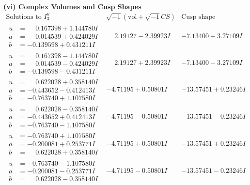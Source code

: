 \documentclass[1p]{elsarticle_modified}
\theoremstyle{definition}
\newcommand{\I}{\sqrt{-1}}
\begin{document}
\newpage\flushleft \textbf{(vi) Complex Volumes and Cusp Shapes}
$$\begin{array}{c|c|c}  
\text{Solutions to }I^u_{3}& \I (\text{vol} + \sqrt{-1}CS) & \text{Cusp shape}\\
 \hline 
\begin{aligned}
u &= \phantom{-}0.167398 + 1.144780 I \\
a &= \phantom{-}0.014539 + 0.424029 I \\
b &= -0.139598 + 0.431211 I\end{aligned}
 & \phantom{-}2.19127 - 2.39923 I & -7.13400 + 3.27109 I \\ \hline\begin{aligned}
u &= \phantom{-}0.167398 - 1.144780 I \\
a &= \phantom{-}0.014539 - 0.424029 I \\
b &= -0.139598 - 0.431211 I\end{aligned}
 & \phantom{-}2.19127 + 2.39923 I & -7.13400 - 3.27109 I \\ \hline\begin{aligned}
u &= \phantom{-}0.622028 + 0.358140 I \\
a &= -0.443652 - 0.412413 I \\
b &= -0.763740 + 1.107580 I\end{aligned}
 & -4.71195 + 0.50801 I & -13.57451 + 0.23246 I \\ \hline\begin{aligned}
u &= \phantom{-}0.622028 - 0.358140 I \\
a &= -0.443652 + 0.412413 I \\
b &= -0.763740 - 1.107580 I\end{aligned}
 & -4.71195 - 0.50801 I & -13.57451 - 0.23246 I \\ \hline\begin{aligned}
u &= -0.763740 + 1.107580 I \\
a &= -0.200081 + 0.253771 I \\
b &= \phantom{-}0.622028 + 0.358140 I\end{aligned}
 & -4.71195 + 0.50801 I & -13.57451 + 0.23246 I \\ \hline\begin{aligned}
u &= -0.763740 - 1.107580 I \\
a &= -0.200081 - 0.253771 I \\
b &= \phantom{-}0.622028 - 0.358140 I\end{aligned}
 & -4.71195 - 0.50801 I & -13.57451 - 0.23246 I \\ \hline\begin{aligned}

\end{aligned}
\end{array}$$
\end{document}
